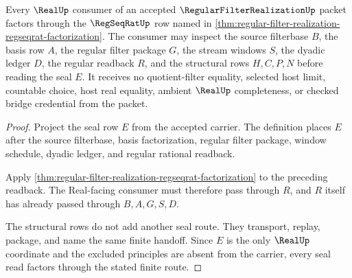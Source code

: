 \begin{theorem}
\label{thm:regular-filter-realization-real-seal-handoff}
Every $\RealUp$ consumer of an accepted $\RegularFilterRealizationUp$ packet factors through the $\RegSeqRatUp$ row named in \autoref{thm:regular-filter-realization-regseqrat-factorization}. The consumer may inspect the source filterbase $B$, the basis row $A$, the regular filter package $G$, the stream windows $S$, the dyadic ledger $D$, the regular readback $R$, and the structural rows $H,C,P,N$ before reading the seal $E$. It receives no quotient-filter equality, selected host limit, countable choice, host real equality, ambient $\RealUp$ completeness, or checked bridge credential from the packet.
\end{theorem}
\begin{proof}
Project the seal row $E$ from the accepted carrier. The definition places $E$ after the source filterbase, basis factorization, regular filter package, window schedule, dyadic ledger, and regular rational readback.

Apply \autoref{thm:regular-filter-realization-regseqrat-factorization} to the preceding readback. The Real-facing consumer must therefore pass through $R$, and $R$ itself has already passed through $B,A,G,S,D$.

The structural rows do not add another seal route. They transport, replay, package, and name the same finite handoff. Since $E$ is the only $\RealUp$ coordinate and the excluded principles are absent from the carrier, every seal read factors through the stated finite route.
\end{proof}


\begin{closurestatus}{\RegularFilterRealizationUp}
  \theoryclosure{\seedClosure}
  \formalstatus{\unformalizedV}
\end{closurestatus}
